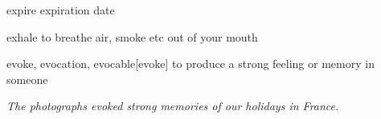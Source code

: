 \begin{DefWord}{expire}
    expiration date
\end{DefWord}

\begin{DefWord}{exhale}
    to breathe air, smoke etc out of your mouth
\end{DefWord}

\begin{DefWord}{evoke, evocation, evocable}[evoke]
    to produce a strong feeling or memory in someone

    \textit{The photographs evoked strong memories of our holidays in France.}

\end{DefWord}